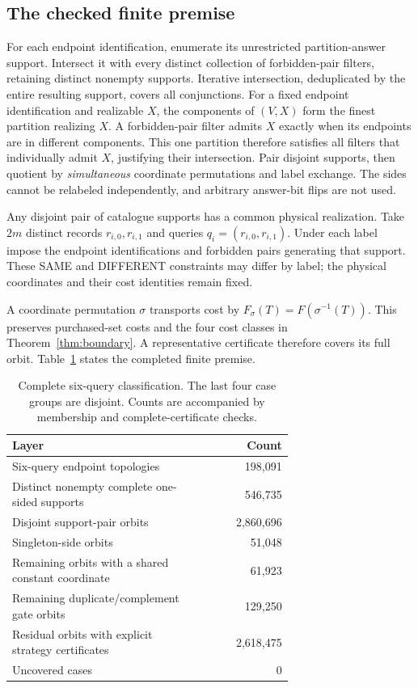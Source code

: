 \documentclass[pdflatex,sn-mathphys-num]{sn-jnl}
\theoremstyle{thmstyleone}
\theoremstyle{thmstylethree}
\theoremstyle{thmstyletwo}
\begin{document}
\subsection{The checked finite premise}\label{sec:premise}
For each endpoint identification, enumerate its unrestricted partition-answer support. Intersect it with every distinct collection of forbidden-pair filters, retaining distinct nonempty supports. Iterative intersection, deduplicated by the entire resulting support, covers all conjunctions. For a fixed endpoint identification and realizable $X$, the components of $(V,X)$ form the finest partition realizing $X$. A forbidden-pair filter admits $X$ exactly when its endpoints are in different components. This one partition therefore satisfies all filters that individually admit $X$, justifying their intersection. Pair disjoint supports, then quotient by \emph{simultaneous} coordinate permutations and label exchange. The sides cannot be relabeled independently, and arbitrary answer-bit flips are not used.

Any disjoint pair of catalogue supports has a common physical realization. Take $2m$ distinct records $r_{i,0},r_{i,1}$ and queries $q_i=(r_{i,0},r_{i,1})$. Under each label impose the endpoint identifications and forbidden pairs generating that support. These SAME and DIFFERENT constraints may differ by label; the physical coordinates and their cost identities remain fixed.

A coordinate permutation $\sigma$ transports cost by $F_\sigma(T)=F(\sigma^{-1}(T))$. This preserves purchased-set costs and the four cost classes in Theorem~\ref{thm:boundary}. A representative certificate therefore covers its full orbit. Table~\ref{tab:coverage} states the completed finite premise.

\begin{table}[ht]
\centering\small
\begin{tabular}{@{}p{0.69\linewidth}r@{}}
\toprule
Layer & Count\\\midrule
Six-query endpoint topologies & 198,091\\
Distinct nonempty complete one-sided supports & 546,735\\
Disjoint support-pair orbits & 2,860,696\\
Singleton-side orbits & 51,048\\
Remaining orbits with a shared constant coordinate & 61,923\\
Remaining duplicate/complement gate orbits & 129,250\\
Residual orbits with explicit strategy certificates & 2,618,475\\
Uncovered cases & 0\\\bottomrule
\end{tabular}
\caption{Complete six-query classification. The last four case groups are disjoint. Counts are accompanied by membership and complete-certificate checks.}\label{tab:coverage}
\end{table}
\end{document}

